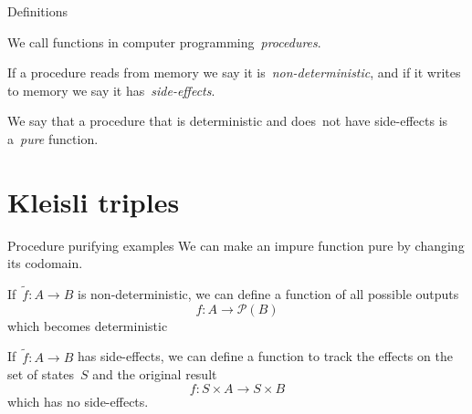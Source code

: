\documentclass[notes]{beamer}
\begin{document}
\begin{frame}{Definitions}
    \begin{definition}[Procedure]
        We call functions in computer programming~\emph{procedures}.
    \end{definition}

    \pause

    \begin{definition}
        If a procedure reads from memory we say it is~\emph{non-deterministic},
        and if it writes to memory we say it has~\emph{side-effects}.

        We say that a procedure that is deterministic and does~\alert{not} have
        side-effects is a~\emph{pure} function.
    \end{definition}
\end{frame}

\section{Kleisli triples}

\begin{frame}{Procedure purifying examples}
    We can make an impure function pure by changing its codomain.


    \pause

    \begin{example}
        If~\(\tilde{f}:A\longrightarrow B\) is non-deterministic, we can define
        a function of all possible outputs
        \[
            f:A\longrightarrow\mathcal{P}(B)
        \]
        which becomes deterministic
    \end{example}

    \pause

    \begin{example}
        If~\(\tilde{f}:A\longrightarrow B\) has side-effects, we can define a
        function to track the effects on the set of states~\(S\) and the
        original result
        \[
            f:S\times A\longrightarrow S\times B
        \]
        which has no side-effects.
    \end{example}
\end{frame}
\end{document}
